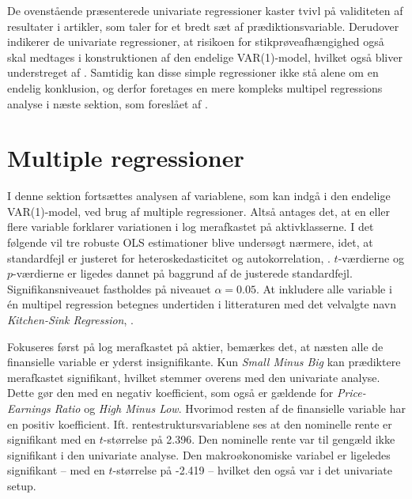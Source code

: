 \documentclass[
  a4paper,
  oneside]{memoir}
\begin{document}
De ovenstående præsenterede univariate regressioner kaster tvivl på validiteten af resultater i artikler, som taler for et bredt sæt af prædiktionsvariable. Derudover indikerer de univariate regressioner, at risikoen for stikprøveafhængighed også skal medtages i konstruktionen af den endelige VAR(1)-model, hvilket også bliver understreget af \citep{Goyal2007}. Samtidig kan disse simple regressioner ikke stå alene om en endelig konklusion, og derfor foretages en mere kompleks multipel regressions analyse i næste sektion, som foreslået af \citep{Goyal2007}.

\hypertarget{multreg}{%
\section{Multiple regressioner}\label{multreg}}

I denne sektion fortsættes analysen af variablene, som kan indgå i den endelige VAR(1)-model, ved brug af multiple regressioner. Altså antages det, at en eller flere variable forklarer variationen i log merafkastet på aktivklasserne. I det følgende vil tre robuste OLS estimationer blive undersøgt nærmere, idet, at standardfejl er justeret for heteroskedasticitet og autokorrelation, \citep{Newey1987}. \(t\)-værdierne og \(p\)-værdierne er ligedes dannet på baggrund af de justerede standardfejl. Signifikansniveauet fastholdes på niveauet \(\alpha=0.05\). At inkludere alle variable i én multipel regression betegnes undertiden i litteraturen med det velvalgte navn \emph{Kitchen-Sink Regression}, \citep{Goyal2007}.

Fokuseres først på log merafkastet på aktier, bemærkes det, at næsten alle de finansielle variable er yderst insignifikante. Kun \emph{Small Minus Big} kan prædiktere merafkastet signifikant, hvilket stemmer overens med den univariate analyse. Dette gør den med en negativ koefficient, som også er gældende for \emph{Price-Earnings Ratio} og \emph{High Minus Low}. Hvorimod resten af de finansielle variable har en positiv koefficient. Ift. rentestruktursvariablene ses at den nominelle rente er signifikant med en \(t\)-størrelse på 2.396. Den nominelle rente var til gengæld ikke signifikant i den univariate analyse. Den makroøkonomiske variabel er ligeledes signifikant -- med en \(t\)-størrelse på -2.419 -- hvilket den også var i det univariate setup.
\end{document}
